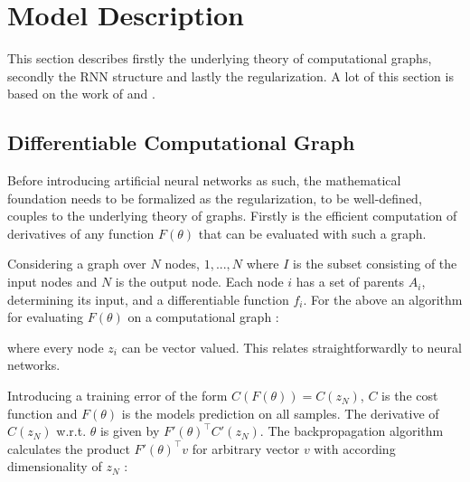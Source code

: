 \chapter{Model Description}

This section describes firstly the underlying theory of computational graphs, secondly the RNN structure and lastly the regularization. A lot of this section is based on the work of \textcite{suts} and \textcite{Martens2012}.

\section{Differentiable Computational Graph}

Before introducing artificial neural networks as such, the mathematical foundation needs to be formalized as the regularization, to be well-defined, couples to the underlying theory of graphs. Firstly is the efficient computation of derivatives of any function $F(\theta)$ that can be evaluated with such a graph. 

Considering a graph over $N$ nodes, $1, ..., N$ where $I$ is the subset consisting of the input nodes and $N$ is the output node. Each node $i$ has a set of parents $A_i$, determining its input, and a differentiable function $f_i$. For the above an algorithm for evaluating $F(\theta)$ on a computational graph \cite{suts}:

\begin{algorithmic}[1]
    \EndFor
\end{algorithmic}

where every node $z_i$ can be vector valued. This relates straightforwardly to neural networks.

Introducing a training error of the form $C(F(\theta)) = C(z_N)$, $C$ is the cost function and $F(\theta)$ is the models prediction on all samples. The derivative of $C(z_N)$ w.r.t. $\theta$ is given by $F'(\theta)^\top C'(z_N)$. The backpropagation algorithm calculates the product $F'(\theta)^\top v$ for arbitrary vector $v$ with according dimensionality of $z_N$ \cite{suts}:

\begin{algorithmic}[1]
    \EndFor
    \EndFor
\end{algorithmic}

